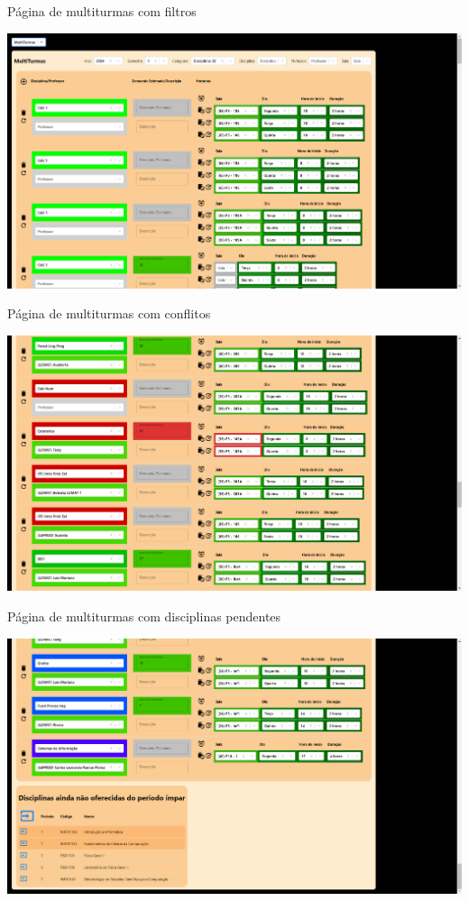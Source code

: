 \begin{MyCenteredFigure} \caption{Página de multiturmas com filtros} \label{fig:multiFiltros}
  \includegraphics[width=\textwidth]{files/img/2.02!7-resultados/2-Multiturmas-Filtros.png}
\end{MyCenteredFigure}

\begin{MyCenteredFigure} \caption{Página de multiturmas com conflitos} \label{fig:multiConflitos}
  \includegraphics[width=\textwidth]{files/img/2.02!7-resultados/3-Multiturmas-Conflitos.png}
\end{MyCenteredFigure}

\begin{MyCenteredFigure} \caption{Página de multiturmas com disciplinas pendentes} \label{fig:multiDisciplinas}
  \includegraphics[width=\textwidth]{files/img/2.02!7-resultados/4-Multiturmas-DisciplinasPendentes.png}
\end{MyCenteredFigure}

